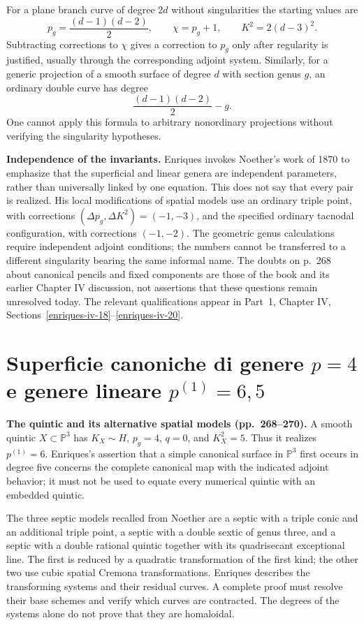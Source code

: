 For a plane branch curve of degree \(2d\) without singularities the starting values are
\[
p_g=\frac{(d-1)(d-2)}2,\qquad
\chi=p_g+1,\qquad K^2=2(d-3)^2.
\]
Subtracting corrections to \(\chi\) gives a correction to \(p_g\) only after regularity is justified, usually through the corresponding adjoint system. Similarly, for a generic projection of a smooth surface of degree \(d\) with section genus \(g\), an ordinary double curve has degree
\[
\frac{(d-1)(d-2)}2-g.
\]
One cannot apply this formula to arbitrary nonordinary projections without verifying the singularity hypotheses.

\textbf{Independence of the invariants.}
Enriques invokes Noether's work of 1870 to emphasize that the superficial and linear genera are independent parameters, rather than universally linked by one equation. This does not say that every pair is realized. His local modifications of spatial models use an ordinary triple point, with corrections \((\Delta p_g,\Delta K^2)=(-1,-3)\), and the specified ordinary tacnodal configuration, with corrections \((-1,-2)\). The geometric genus calculations require independent adjoint conditions; the numbers cannot be transferred to a different singularity bearing the same informal name. The doubts on p.~268 about canonical pencils and fixed components are those of the book and its earlier Chapter IV discussion, not assertions that these questions remain unresolved today. The relevant qualifications appear in Part~1, Chapter IV, Sections~\ref{enriques-iv-18}--\ref{enriques-iv-20}.

\section{Superficie canoniche di genere \texorpdfstring{$p=4$}{p=4} e genere lineare \texorpdfstring{$p^{(1)}=6,5$}{p(1)=6,5}}
\label{cp2-viii-2}

\textbf{The quintic and its alternative spatial models (pp.~268--270).}
A smooth quintic \(X\subset\mathbb P^3\) has \(K_X\sim H\), \(p_g=4\), \(q=0\), and \(K_X^2=5\). Thus it realizes \(p^{(1)}=6\). Enriques's assertion that a simple canonical surface in \(\mathbb P^3\) first occurs in degree five concerns the complete canonical map with the indicated adjoint behavior; it must not be used to equate every numerical quintic with an embedded quintic.

The three septic models recalled from Noether are a septic with a triple conic and an additional triple point, a septic with a double sextic of genus three, and a septic with a double rational quintic together with its quadrisecant exceptional line. The first is reduced by a quadratic transformation of the first kind; the other two use cubic spatial Cremona transformations. Enriques describes the transforming systems and their residual curves. A complete proof must resolve their base schemes and verify which curves are contracted. The degrees of the systems alone do not prove that they are homaloidal.

